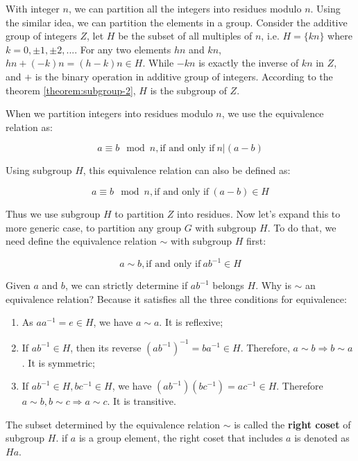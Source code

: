 \documentclass[b5paper]{article}
\begin{document}
With integer $n$, we can partition all the integers into residues modulo $n$. Using the similar idea, we can partition the elements in a group. Consider the additive group of integers $Z$, let $H$ be the subset of all multiples of $n$, i.e. $H = \{ kn \}$ where $k = 0, \pm 1, \pm 2, ...$. For any two elements $hn$ and $kn$, $hn + (-k)n = (h - k)n \in H$. While $-kn$ is exactly the inverse of $kn$ in $Z$, and $+$ is the binary operation in additive group of integers. According to the theorem \ref{theorem:subgroup-2}, $H$ is the subgroup of $Z$.

When we partition integers into residues modulo $n$, we use the equivalence relation as:

\[
a \equiv b \mod n, \text{if and only if}\ n | (a - b)
\]

Using subgroup $H$, this equivalence relation can also be defined as:

\[
a \equiv b \mod n, \text{if and only if}\ (a - b) \in H
\]

Thus we use subgroup $H$ to partition $Z$ into residues. Now let's expand this to more generic case, to partition any group $G$ with subgroup $H$. To do that, we need define the equivalence relation $\sim$ with subgroup $H$ first:

\[
a \sim b, \text{if and only if}\ ab^{-1} \in H
\]

Given $a$ and $b$, we can strictly determine if $ab^{-1}$ belongs $H$. Why is $\sim$ an equivalence relation? Because it satisfies all the three conditions for equivalence:

\begin{enumerate}
\item As $aa^{-1} = e \in H$, we have $a \sim a$. It is reflexive;
\item If $ab^{-1} \in H$, then its reverse $(ab^{-1})^{-1}= ba^{-1} \in H$. Therefore, $a \sim b \Rightarrow b \sim a$. It is symmetric;
\item If $ab^{-1} \in H, bc^{-1} \in H$, we have $(ab^{-1})(bc^{-1}) = ac^{-1} \in H$. Therefore $a \sim b, b \sim c \Rightarrow a \sim c$. It is transitive.
\end{enumerate}

\begin{definition}
The subset determined by the equivalence relation $\sim$ is called the \textbf{right coset} of subgroup $H$. if $a$ is a group element, the right coset that includes $a$ is denoted as $Ha$.
\end{definition}
\end{document}
